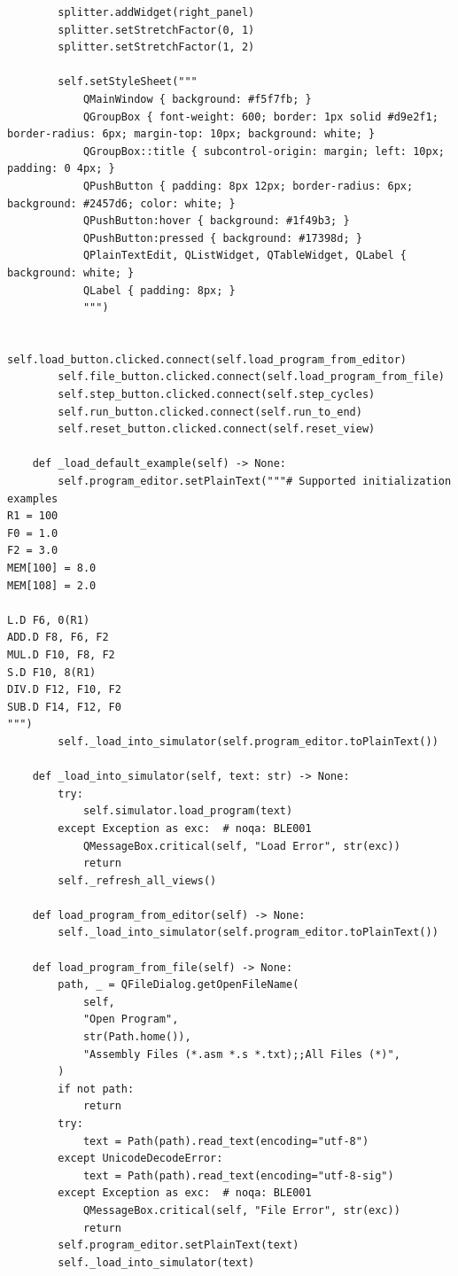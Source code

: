 \documentclass[12pt,a4paper]{ctexart}
\begin{document}
\begin{lstlisting}
        splitter.addWidget(right_panel)
        splitter.setStretchFactor(0, 1)
        splitter.setStretchFactor(1, 2)

        self.setStyleSheet("""
            QMainWindow { background: #f5f7fb; }
            QGroupBox { font-weight: 600; border: 1px solid #d9e2f1; border-radius: 6px; margin-top: 10px; background: white; }
            QGroupBox::title { subcontrol-origin: margin; left: 10px; padding: 0 4px; }
            QPushButton { padding: 8px 12px; border-radius: 6px; background: #2457d6; color: white; }
            QPushButton:hover { background: #1f49b3; }
            QPushButton:pressed { background: #17398d; }
            QPlainTextEdit, QListWidget, QTableWidget, QLabel { background: white; }
            QLabel { padding: 8px; }
            """)

        self.load_button.clicked.connect(self.load_program_from_editor)
        self.file_button.clicked.connect(self.load_program_from_file)
        self.step_button.clicked.connect(self.step_cycles)
        self.run_button.clicked.connect(self.run_to_end)
        self.reset_button.clicked.connect(self.reset_view)

    def _load_default_example(self) -> None:
        self.program_editor.setPlainText("""# Supported initialization examples
R1 = 100
F0 = 1.0
F2 = 3.0
MEM[100] = 8.0
MEM[108] = 2.0

L.D F6, 0(R1)
ADD.D F8, F6, F2
MUL.D F10, F8, F2
S.D F10, 8(R1)
DIV.D F12, F10, F2
SUB.D F14, F12, F0
""")
        self._load_into_simulator(self.program_editor.toPlainText())

    def _load_into_simulator(self, text: str) -> None:
        try:
            self.simulator.load_program(text)
        except Exception as exc:  # noqa: BLE001
            QMessageBox.critical(self, "Load Error", str(exc))
            return
        self._refresh_all_views()

    def load_program_from_editor(self) -> None:
        self._load_into_simulator(self.program_editor.toPlainText())

    def load_program_from_file(self) -> None:
        path, _ = QFileDialog.getOpenFileName(
            self,
            "Open Program",
            str(Path.home()),
            "Assembly Files (*.asm *.s *.txt);;All Files (*)",
        )
        if not path:
            return
        try:
            text = Path(path).read_text(encoding="utf-8")
        except UnicodeDecodeError:
            text = Path(path).read_text(encoding="utf-8-sig")
        except Exception as exc:  # noqa: BLE001
            QMessageBox.critical(self, "File Error", str(exc))
            return
        self.program_editor.setPlainText(text)
        self._load_into_simulator(text)


\end{lstlisting}
\end{document}
